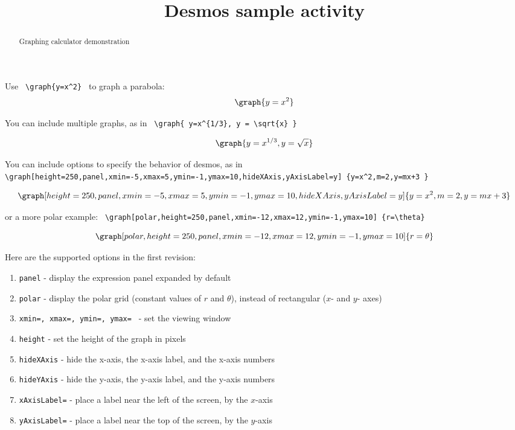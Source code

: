 \documentclass[handout]{ximera}
\title{Desmos sample activity}
\begin{document}
\begin{abstract} Graphing calculator demonstration
\end{abstract}


\maketitle

Use \verb! \graph{y=x^2} ! to graph a parabola:
\[ \graph{y=x^2} \]

You can include multiple graphs, as in \verb! \graph{ y=x^{1/3}, y = \sqrt{x} } !

\[\graph{ y=x^{1/3}, y = \sqrt{x} } \]

You can include options to specify the behavior of desmos, as in
\verb! \graph[height=250,panel,xmin=-5,xmax=5,ymin=-1,ymax=10,hideXAxis,yAxisLabel=y] {y=x^2,m=2,y=mx+3 } !

\[ \graph[height=250,panel,xmin=-5,xmax=5,ymin=-1,ymax=10,hideXAxis,yAxisLabel=y] {y=x^2,m=2,y=mx+3 } \]

or a more polar example: \verb! \graph[polar,height=250,panel,xmin=-12,xmax=12,ymin=-1,ymax=10] {r=\theta} !

\[ \graph[polar,height=250,panel,xmin=-12,xmax=12,ymin=-1,ymax=10] {r=\theta} \]

Here are the supported options in the first revision:

\begin{enumerate}
\item \texttt{panel} - display the expression panel expanded by default
\item \texttt{polar} - display the polar grid (constant values of $r$ and $\theta$), instead of rectangular ($x$- and $y$- axes)
\item \texttt{xmin=, xmax=, ymin=, ymax= } - set the viewing window
\item \texttt{height} - set the height of the graph in pixels
\item \texttt{hideXAxis} - hide the x-axis, the x-axis label, and the x-axis numbers
\item \texttt{hideYAxis} - hide the y-axis, the y-axis label, and the y-axis numbers
\item \texttt{xAxisLabel=} - place a label near the left of the screen, by the $x$-axis
\item \texttt{yAxisLabel=} - place a label near the top of the screen, by the $y$-axis
\end{enumerate}
\end{document}
